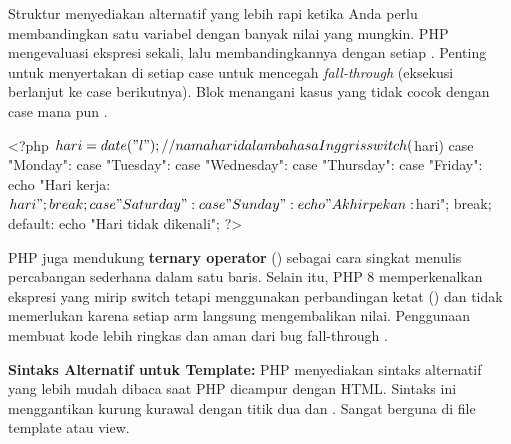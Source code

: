 
Struktur  menyediakan alternatif yang lebih rapi ketika Anda perlu membandingkan satu variabel dengan banyak nilai yang mungkin. PHP mengevaluasi ekspresi  sekali, lalu membandingkannya dengan setiap . Penting untuk menyertakan  di setiap case untuk mencegah \textit{fall-through} (eksekusi berlanjut ke case berikutnya). Blok  menangani kasus yang tidak cocok dengan case mana pun \cite{w3schoolsPhp}.

\begin{webcode}[language=PHP, caption={switch untuk pemilihan menu}]
<?php
$hari = date("l");  // nama hari dalam bahasa Inggris

switch ($hari) {
    case "Monday":
    case "Tuesday":
    case "Wednesday":
    case "Thursday":
    case "Friday":
        echo "Hari kerja: $hari";
        break;
    case "Saturday":
    case "Sunday":
        echo "Akhir pekan: $hari";
        break;
    default:
        echo "Hari tidak dikenali";
}
?>
\end{webcode}

PHP juga mendukung \textbf{ternary operator} () sebagai cara singkat menulis percabangan sederhana dalam satu baris. Selain itu, PHP 8 memperkenalkan ekspresi  yang mirip switch tetapi menggunakan perbandingan ketat (\code{===}) dan tidak memerlukan  karena setiap arm langsung mengembalikan nilai. Penggunaan  membuat kode lebih ringkas dan aman dari bug fall-through \cite{phpRightWay}.

\begin{catatan}
\textbf{Sintaks Alternatif untuk Template:} PHP menyediakan sintaks alternatif  yang lebih mudah dibaca saat PHP dicampur dengan HTML. Sintaks ini menggantikan kurung kurawal dengan titik dua dan . Sangat berguna di file template atau view.
\end{catatan}

